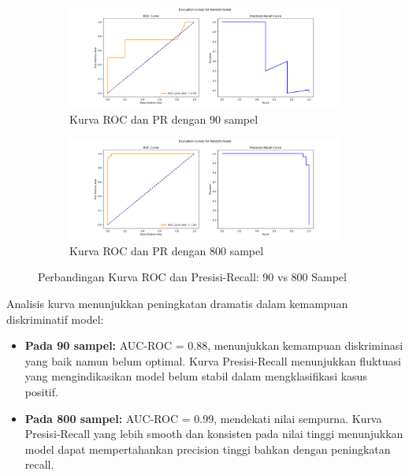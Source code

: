 \begin{figure}[htbp]
    \centering
    \begin{subfigure}{0.48\textwidth}
        \centering
        \includegraphics[width=\textwidth]{figures/curves_rf_90.png}
        \caption{Kurva ROC dan PR dengan 90 sampel}
        \label{fig:curves_90}
    \end{subfigure}
    \hfill
    \begin{subfigure}{0.48\textwidth}
        \centering
        \includegraphics[width=\textwidth]{figures/curves_rf_800.png}
        \caption{Kurva ROC dan PR dengan 800 sampel}
        \label{fig:curves_800}
    \end{subfigure}
    \caption{Perbandingan Kurva ROC dan Presisi-Recall: 90 vs 800 Sampel}
    \label{fig:roc_pr_comparison}
\end{figure}

Analisis kurva menunjukkan peningkatan dramatis dalam kemampuan diskriminatif model:

\begin{itemize}
    \item \textbf{Pada 90 sampel:} AUC-ROC = 0.88, menunjukkan kemampuan diskriminasi yang baik namun belum optimal. Kurva Presisi-Recall menunjukkan fluktuasi yang mengindikasikan model belum stabil dalam mengklasifikasi kasus positif.
    
    \item \textbf{Pada 800 sampel:} AUC-ROC = 0.99, mendekati nilai sempurna. Kurva Presisi-Recall yang lebih smooth dan konsisten pada nilai tinggi menunjukkan model dapat mempertahankan precision tinggi bahkan dengan peningkatan recall.
\end{itemize}

